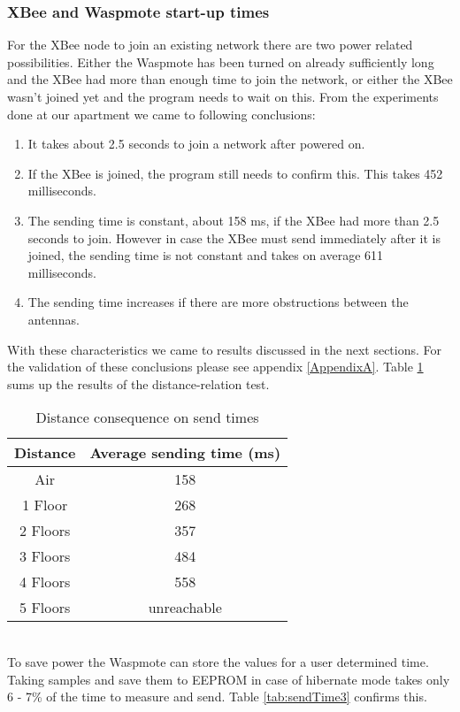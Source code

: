 \subsubsection{XBee and Waspmote start-up times}
For the XBee node to join an existing network there are two power related possibilities. Either the Waspmote has been turned on already sufficiently long and the XBee had more than enough time to join the network, or either the XBee wasn't joined yet and the program needs to wait on this. From the experiments done at our apartment we came to following conclusions:
\begin{enumerate}
\item It takes about 2.5 seconds to join a network after powered on.
\item If the XBee is joined, the program still needs to confirm this. This takes 452 milliseconds.
\item The sending time is constant, about 158 ms, if the XBee had more than 2.5 seconds to join. However in case the XBee must send immediately after it is joined, the sending time is not constant and takes on average 611 milliseconds.
\item The sending time increases if there are more obstructions between the antennas. 
\end{enumerate}
With these characteristics we came to results discussed in the next sections. For the validation of these conclusions please see appendix \ref{AppendixA}. Table \ref{tab:sendTime} sums up the results of the distance-relation test.
\begin{table}[!ht]
\begin{center}
\begin{tabular}[!ht]{|c|c|}
\hline
\textbf{Distance} & \textbf{Average sending time (ms)}\\
\hline
Air & 158\\
\hline
1 Floor & 268\\
\hline
2 Floors & 357\\
\hline
3 Floors & 484\\
\hline
4 Floors & 558\\
\hline
5 Floors & unreachable\\
\hline
\end{tabular}
\caption{Distance consequence on send times}
\label{tab:sendTime}
\end{center}
\end{table}\\
To save power the Waspmote can store the values for a user determined time. Taking samples and save them to EEPROM in case of hibernate mode takes only 6 - 7\% of the time to measure and send. Table \ref{tab:sendTime3} confirms this.
